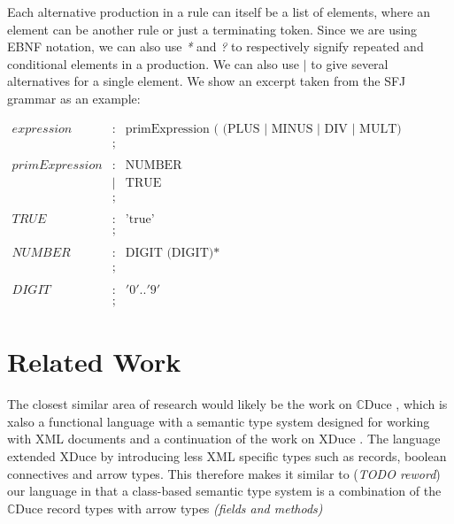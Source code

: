 \documentclass{l4proj}
\begin{document}
Each alternative production in a rule can itself be a list of elements, where an element can be another rule or just a terminating token.
Since we are using EBNF notation, we can also use \emph{*} and \emph{?} to respectively signify repeated and conditional elements in a production.
We can also use $|$ to give several alternatives for a single element.
We show an excerpt taken from the SFJ grammar as an example:

$$
    \begin{array}{llll}
        expression     & : & \mbox{primExpression ( (PLUS | MINUS | DIV | MULT) primExpression)?}
        \\
                       & ;
        \\
        \\
        primExpression & : & \mbox{NUMBER}
        \\
                       & | & \mbox{TRUE}
        \\
                       & ; &
        \\
        \\
        TRUE           & : & \mbox{'true'}
        \\
                       & ; &
        \\
        \\
        NUMBER         & : & \mbox{DIGIT (DIGIT)*}
        \\
                       & ; &
        \\
        \\
        DIGIT          & : & '0'..'9'
        \\
                       & ; &
    \end{array}
$$

\section{Related Work}
The closest similar area of research would likely be the work on $\mathbb{C}$Duce
\citep{Benzaken2003}, which is xalso a functional language with a semantic type system designed for
working with XML documents and a continuation of the work on XDuce \citep{Hosoya2003}. The language
extended XDuce by introducing less XML specific types such as records, boolean connectives and arrow
types. This therefore makes it similar to (\textit{TODO reword}) our language in that a class-based
semantic type system is a combination of the $\mathbb{C}$Duce record types with arrow types
\textit{(fields and methods)}
\end{document}
